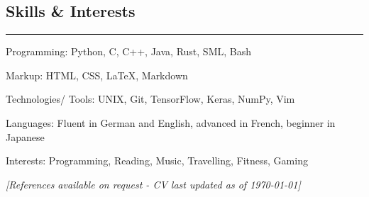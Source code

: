 \documentclass[10pt,letterpaper]{article}
\makeatletter
\newcommand{\headerrow}[2]
{\begin{tabular*}{\linewidth}{l@{\extracolsep{\fill}}r}
	#1 &
	#2 \\
\end{tabular*}}
\makeatother
\begin{document}
\subsection*{Skills \& Interests}
\hrule
\vspace{0.4em}
\begin{description*}
	\item[Programming:]
	Python, C, C++, Java, Rust, SML, Bash
    \item[Markup:]
    HTML, CSS, \LaTeX, Markdown
	\item[Technologies/ Tools:]
	UNIX, Git, TensorFlow, Keras, NumPy, Vim
	\item[Languages:]
	Fluent in German and English, advanced in French, beginner in Japanese
   	\item[Interests:]
    Programming, Reading, Music, Travelling, Fitness, Gaming
\end{description*}

% 
% 
% 

% 
% 

\hfill \small \textit{[References available on request - CV last updated as of {\today}]}
\end{document}
